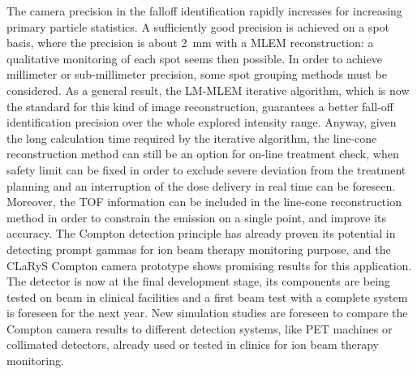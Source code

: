 The camera precision in the falloff identification rapidly increases for increasing primary particle statistics. A sufficiently good precision is achieved on a spot basis, where the precision is about 2~mm with a MLEM reconstruction: a qualitative monitoring of each spot seems then possible. In order to achieve millimeter or sub-millimeter precision, some spot grouping methods must be considered. As a general result, the LM-MLEM iterative algorithm, which is now the standard for this kind of image reconstruction,  guarantees a better fall-off identification precision over the whole explored intensity range. Anyway, given the long calculation time required by the iterative algorithm, the line-cone reconstruction method can still be an option for on-line treatment check, when safety limit can be fixed in order to exclude severe deviation from the treatment planning and an interruption of the dose delivery in real time can be foreseen. Moreover, the TOF information can be included in the line-cone reconstruction method in order to constrain the emission on a single point, and improve its accuracy.\newline
The Compton detection principle has already proven its potential in detecting prompt gammas for ion beam therapy monitoring purpose, and the CLaRyS Compton camera prototype shows promising results for this application. The detector is now at the final development stage, its components are being tested on beam in clinical facilities and a first beam test with a complete system is foreseen for the next year. New simulation studies are foreseen to compare the Compton camera results to different detection systems, like PET machines or collimated detectors, already used or tested in clinics for ion beam therapy monitoring.            


